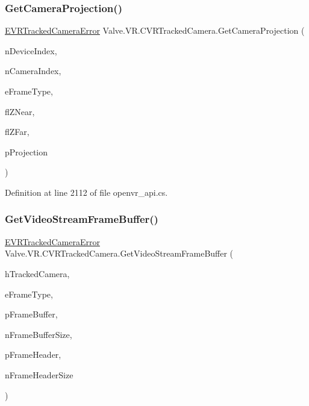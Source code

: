 \subsubsection{\texorpdfstring{GetCameraProjection()}{GetCameraProjection()}}
{\footnotesize\ttfamily \mbox{\hyperlink{namespace_valve_1_1_v_r_ad0e012e846f5d93848783c044614cfd3}{E\+V\+R\+Tracked\+Camera\+Error}} Valve.\+V\+R.\+C\+V\+R\+Tracked\+Camera.\+Get\+Camera\+Projection (\begin{DoxyParamCaption}\item[{uint}]{n\+Device\+Index,  }\item[{uint}]{n\+Camera\+Index,  }\item[{\mbox{\hyperlink{namespace_valve_1_1_v_r_a9962211bc3fe98c2683db188c12c9afd}{E\+V\+R\+Tracked\+Camera\+Frame\+Type}}}]{e\+Frame\+Type,  }\item[{float}]{fl\+Z\+Near,  }\item[{float}]{fl\+Z\+Far,  }\item[{ref \mbox{\hyperlink{struct_valve_1_1_v_r_1_1_hmd_matrix44__t}{Hmd\+Matrix44\+\_\+t}}}]{p\+Projection }\end{DoxyParamCaption})}



Definition at line 2112 of file openvr\+\_\+api.\+cs.

\mbox{\label{class_valve_1_1_v_r_1_1_c_v_r_tracked_camera_ada866b6a0bfbdc3a1a7c3ab399317481}} 
\subsubsection{\texorpdfstring{GetVideoStreamFrameBuffer()}{GetVideoStreamFrameBuffer()}}
{\footnotesize\ttfamily \mbox{\hyperlink{namespace_valve_1_1_v_r_ad0e012e846f5d93848783c044614cfd3}{E\+V\+R\+Tracked\+Camera\+Error}} Valve.\+V\+R.\+C\+V\+R\+Tracked\+Camera.\+Get\+Video\+Stream\+Frame\+Buffer (\begin{DoxyParamCaption}\item[{ulong}]{h\+Tracked\+Camera,  }\item[{\mbox{\hyperlink{namespace_valve_1_1_v_r_a9962211bc3fe98c2683db188c12c9afd}{E\+V\+R\+Tracked\+Camera\+Frame\+Type}}}]{e\+Frame\+Type,  }\item[{Int\+Ptr}]{p\+Frame\+Buffer,  }\item[{uint}]{n\+Frame\+Buffer\+Size,  }\item[{ref \mbox{\hyperlink{struct_valve_1_1_v_r_1_1_camera_video_stream_frame_header__t}{Camera\+Video\+Stream\+Frame\+Header\+\_\+t}}}]{p\+Frame\+Header,  }\item[{uint}]{n\+Frame\+Header\+Size }\end{DoxyParamCaption})}



